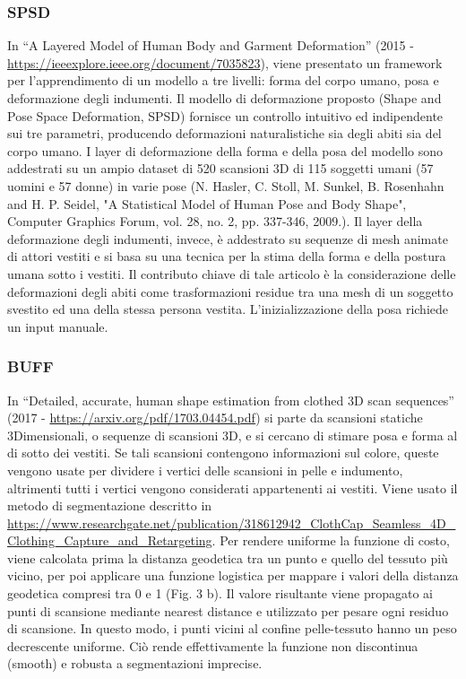 \subsubsection{SPSD}

In “A Layered Model of Human Body and Garment Deformation” (2015 - \url{https://ieeexplore.ieee.org/document/7035823}), viene presentato un framework per l’apprendimento di un modello a tre livelli: forma del corpo umano, posa e deformazione degli indumenti. Il modello di deformazione proposto (Shape and Pose Space Deformation, SPSD) fornisce un controllo intuitivo ed indipendente sui tre parametri, producendo deformazioni naturalistiche sia degli abiti sia del corpo umano. I layer di deformazione della forma e della posa del modello sono addestrati su un ampio dataset di 520 scansioni 3D di 115 soggetti umani (57 uomini e 57 donne) in varie pose (N. Hasler, C. Stoll, M. Sunkel, B. Rosenhahn and H. P. Seidel, "A Statistical Model of Human Pose and Body Shape", Computer Graphics Forum, vol. 28, no. 2, pp. 337-346, 2009.). Il layer della deformazione degli indumenti, invece, è addestrato su sequenze di mesh animate di attori vestiti e si basa su una tecnica per la stima della forma e della postura umana sotto i vestiti. Il contributo chiave di tale articolo è la considerazione delle deformazioni degli abiti come trasformazioni residue tra una mesh di un soggetto svestito ed una della stessa persona vestita.
L'inizializzazione della posa richiede un input manuale.



\subsubsection{BUFF}

In “Detailed, accurate, human shape estimation from clothed 3D scan sequences” (2017 - \url{https://arxiv.org/pdf/1703.04454.pdf}) si parte da scansioni statiche 3Dimensionali, o sequenze di scansioni 3D, e si cercano di stimare posa e forma al di sotto dei vestiti. Se tali scansioni contengono informazioni sul colore, queste vengono usate per dividere i vertici delle scansioni in pelle e indumento, altrimenti tutti i vertici vengono considerati appartenenti ai vestiti. Viene usato il metodo di segmentazione descritto in \url{https://www.researchgate.net/publication/318612942_ClothCap_Seamless_4D_Clothing_Capture_and_Retargeting}. Per rendere uniforme la funzione di costo, viene calcolata prima la distanza geodetica tra un punto e quello del tessuto più vicino, per poi applicare una funzione logistica per mappare i valori della distanza geodetica compresi tra 0 e 1 (Fig. 3 b). Il valore risultante viene propagato ai punti di scansione mediante nearest distance e utilizzato per pesare ogni residuo di scansione. In questo modo, i punti vicini al confine pelle-tessuto hanno un peso decrescente uniforme. Ciò rende effettivamente la funzione non discontinua (smooth) e robusta a segmentazioni imprecise.



